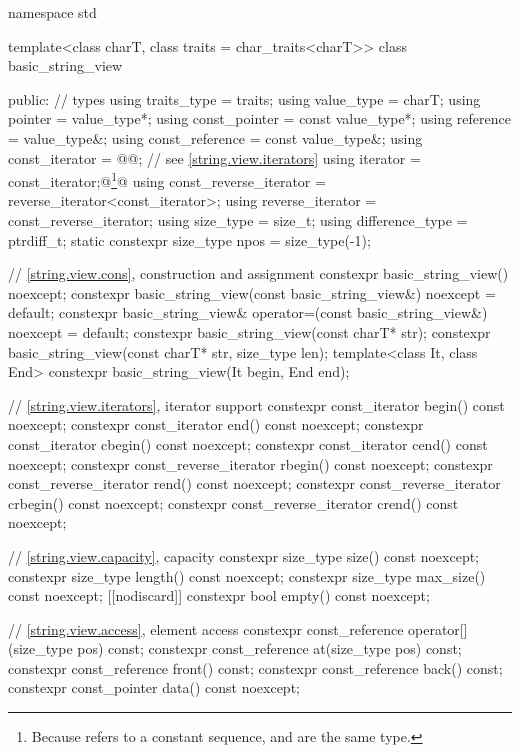\begin{codeblock}
namespace std {
  template<class charT, class traits = char_traits<charT>>
  class basic_string_view {
  public:
    // types
    using traits_type            = traits;
    using value_type             = charT;
    using pointer                = value_type*;
    using const_pointer          = const value_type*;
    using reference              = value_type&;
    using const_reference        = const value_type&;
    using const_iterator         = @@; // see \ref{string.view.iterators}
    using iterator               = const_iterator;@\footnote{Because  refers to a constant sequence,  and  are the same type.}@
    using const_reverse_iterator = reverse_iterator<const_iterator>;
    using reverse_iterator       = const_reverse_iterator;
    using size_type              = size_t;
    using difference_type        = ptrdiff_t;
    static constexpr size_type npos = size_type(-1);

    // \ref{string.view.cons}, construction and assignment
    constexpr basic_string_view() noexcept;
    constexpr basic_string_view(const basic_string_view&) noexcept = default;
    constexpr basic_string_view& operator=(const basic_string_view&) noexcept = default;
    constexpr basic_string_view(const charT* str);
    constexpr basic_string_view(const charT* str, size_type len);
    template<class It, class End>
      constexpr basic_string_view(It begin, End end);

    // \ref{string.view.iterators}, iterator support
    constexpr const_iterator begin() const noexcept;
    constexpr const_iterator end() const noexcept;
    constexpr const_iterator cbegin() const noexcept;
    constexpr const_iterator cend() const noexcept;
    constexpr const_reverse_iterator rbegin() const noexcept;
    constexpr const_reverse_iterator rend() const noexcept;
    constexpr const_reverse_iterator crbegin() const noexcept;
    constexpr const_reverse_iterator crend() const noexcept;

    // \ref{string.view.capacity}, capacity
    constexpr size_type size() const noexcept;
    constexpr size_type length() const noexcept;
    constexpr size_type max_size() const noexcept;
    [[nodiscard]] constexpr bool empty() const noexcept;

    // \ref{string.view.access}, element access
    constexpr const_reference operator[](size_type pos) const;
    constexpr const_reference at(size_type pos) const;
    constexpr const_reference front() const;
    constexpr const_reference back() const;
    constexpr const_pointer data() const noexcept;

}}
\end{codeblock}
